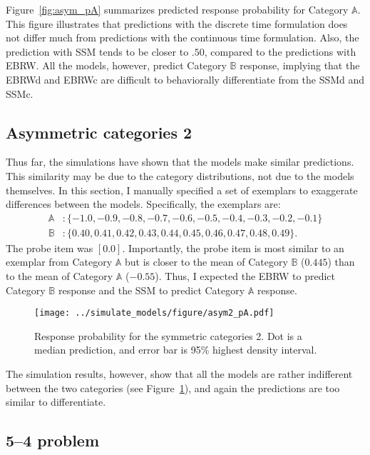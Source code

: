 \documentclass[doc]{apa6}
\begin{document}
Figure~\ref{fig:asym_pA} summarizes predicted response probability for Category $\mathbb{A}$. This
figure illustrates that predictions with the discrete time formulation does not differ much from
predictions with the continuous time formulation. Also, the prediction with SSM tends to be closer
to $.50$, compared to the predictions with EBRW\@. All the models, however, predict Category
$\mathbb{B}$ response, implying that the EBRWd and EBRWc are difficult to behaviorally differentiate
from the SSMd and SSMc.


\subsection{Asymmetric categories 2}

Thus far, the simulations have shown that the models make similar predictions. This similarity may
be due to the category distributions, not due to the models themselves. In this section, I manually
specified a set of exemplars to exaggerate differences between the models.  Specifically, the
exemplars are:
\begin{align}
    \mathbb{A}&: \{-1.0, -0.9, -0.8, -0.7, -0.6, -0.5, -0.4, -0.3, -0.2, -0.1\}\\
    \mathbb{B}&: \{0.40, 0.41, 0.42, 0.43, 0.44, 0.45, 0.46, 0.47, 0.48, 0.49\}.
\end{align}
The probe item was $[0.0]$. Importantly, the probe item is most similar to an exemplar from Category
$\mathbb{A}$ but is closer to the mean of Category $\mathbb{B}$ ($0.445$) than to the mean of Category
$\mathbb{A}$ ($-0.55$). Thus, I expected the EBRW to predict Category $\mathbb{B}$ response and the
SSM to predict Category $\mathbb{A}$ response.

\begin{figure}[h!]
    \texttt{[image: ../simulate\_models/figure/asym2\_pA.pdf]}

    \caption{Response probability for the symmetric categories 2. Dot is a median prediction, and
    error bar is 95\% highest density interval.}

\label{fig:asym2_pA}
\end{figure}

The simulation results, however, show that all the models are rather indifferent between the two
categories (see Figure~\ref{fig:asym2_pA}), and again the predictions are too similar to
differentiate.


\subsection{5--4 problem}
\end{document}
